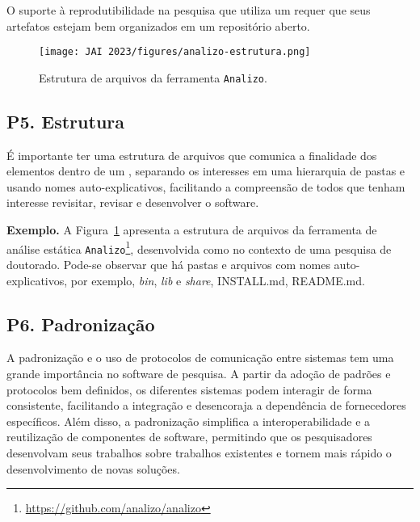 O suporte à reprodutibilidade na pesquisa que utiliza um \RSw requer que seus artefatos estejam bem organizados em um repositório aberto. 

\begin{figure}[htb]
    \centering
    \texttt{[image: JAI 2023/figures/analizo-estrutura.png]}
    \caption{Estrutura de arquivos da ferramenta \texttt{Analizo}.}
    \label{fig:estrutura:analizo}
\end{figure}

\subsection*{P5. Estrutura} 

É importante ter uma estrutura de arquivos que comunica a finalidade dos elementos dentro de um \RS, separando os interesses em uma hierarquia de pastas e usando nomes auto-explicativos, facilitando a compreensão de todos que tenham interesse revisitar, revisar e desenvolver o software.

\noindent\textbf{Exemplo.} A Figura~\ref{fig:estrutura:analizo} apresenta a estrutura de arquivos da ferramenta de análise estática \texttt{Analizo}\footnote{\url{https://github.com/analizo/analizo}}\cite{analizo2010}, desenvolvida como \RSw no contexto de uma pesquisa de doutorado. Pode-se observar que há pastas e arquivos com nomes auto-explicativos, por exemplo, \textit{bin}, \textit{lib} e \textit{share}, INSTALL.md, README.md.

\subsection*{P6. Padronização} 


A padronização e o uso de protocolos de comunicação entre sistemas tem uma grande importância no software de pesquisa. A partir da adoção de padrões e protocolos bem definidos, os diferentes sistemas podem interagir de forma consistente, facilitando a integração e desencoraja a dependência de fornecedores específicos. Além disso, a padronização simplifica a interoperabilidade e a reutilização de componentes de software, permitindo que os pesquisadores desenvolvam seus trabalhos sobre trabalhos existentes e tornem mais rápido o desenvolvimento de novas soluções.


